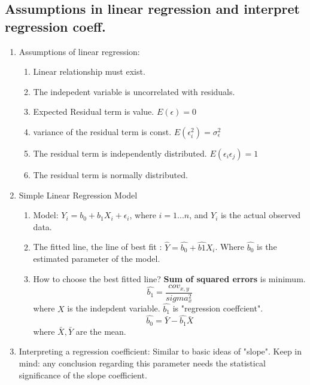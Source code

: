 \documentclass{article}
\begin{document}
\subsection{Assumptions in linear regression and interpret regression coeff.}
\begin{enumerate}
    \item Assumptions of linear regression:
        \begin{enumerate}
            \item Linear relationship must exist.
            \item The indepedent variable is uncorrelated with residuals.
            \item Expected Residual term is value. $E(\epsilon)=0$
            \item variance of the residual term is const. $E(\epsilon_i^2)=
                \sigma_\epsilon^2$
            \item The residual term is independently distributed. 
                $E(\epsilon_i\epsilon_j)=1$    
            \item The residual term is normally distributed.
        \end{enumerate}
    \item Simple Linear Regression Model
        \begin{enumerate}
            \item Model: $Y_i=b_0+b_1X_i+\epsilon_i$, where $i=1...n$, and $Y_i$ is 
     the actual observed data.
            \item The fitted line, the line of best fit
                : $\hat{Y}=\hat{b_0}+\hat{b1}X_i$. Where $\hat{b_0}$
                is the estimated parameter of the model.
            \item How to choose the best fitted line? {\bf Sum of squared errors}
                 is minimum.
                 $$
                    \hat{b_1} = \frac{cov_{x,y}}{sigma_x^2}
                 $$
                 where $X$ is the indepdent variable. $\hat{b_1}$ is 
                 "regression coeffcient".
                 $$
                    \hat{b_0} = \bar Y - \hat{b_1}\bar X
                 $$
                 where $\bar X, \bar Y$ are the mean.
        \end{enumerate}
    \item Interpreting a regression coefficient: Similar to basic ideas of 
        "slope". Keep in mind: any conclusion regarding this parameter needs 
        the statistical significance of the slope coefficient.
\end{enumerate}
\end{document}
